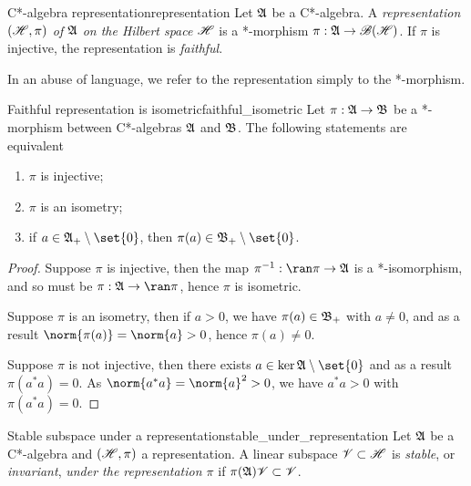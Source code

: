 \begin{definition}{C*-algebra representation}{representation}
    Let \(\mathfrak{A}\) be a C*-algebra. A \emph{representation \((\mathscr{H}, \pi)\) of \(\mathfrak{A}\) on the Hilbert space \(\mathscr{H}\)} is a *-morphism \(\pi : \mathfrak{A} \to \mathscr{B}(\mathscr{H})\). If \(\pi\) is injective, the representation is \emph{faithful}.
\end{definition}
\begin{remark}
    In an abuse of language, we refer to the representation simply to the *-morphism.
\end{remark}


\begin{proposition}{Faithful representation is isometric}{faithful_isometric}
    Let \(\pi : \mathfrak{A} \to \mathfrak{B}\) be a *-morphism between C*-algebras \(\mathfrak{A}\) and \(\mathfrak{B}\). The following statements are equivalent
    \begin{enumerate}[label=(\alph*)]
        \item \(\pi\) is injective;
        \item \(\pi\) is an isometry;
        \item if \(a \in \algebra{A}_+ \setminus\set{0}\), then \(\pi(a) \in \algebra{B}_+\setminus\set{0}\).
    \end{enumerate}
\end{proposition}
\begin{proof}
    Suppose \(\pi\) is injective, then the map \(\pi^{-1} : \ran\pi \to \algebra{A}\) is a *-isomorphism, and so must be \(\pi : \algebra{A} \to \ran\pi\), hence \(\pi\) is isometric.

    Suppose \(\pi\) is an isometry, then if \(a > 0\), we have \(\pi(a) \in \mathfrak{B}_+\) with \(a \neq 0\), and as a result \(\norm{\pi(a)} = \norm{a} > 0\), hence \(\pi(a) \neq 0\).

    Suppose \(\pi\) is not injective, then there exists \(a \in \ker{\algebra{A}}\setminus\set{0}\) and as a result \(\pi(a^*a) = 0\). As \(\norm{a^*a} = \norm{a}^2 > 0\), we have \(a^*a > 0\) with \(\pi(a^*a) = 0\).
\end{proof}
\begin{definition}{Stable subspace under a representation}{stable_under_representation}
    Let \(\mathfrak{A}\) be a C*-algebra and \((\mathscr{H}, \pi)\) a representation. A linear subspace \(\mathscr{V} \subset \mathscr{H}\) is \emph{stable}, or \emph{invariant}, \emph{under the representation \(\pi\)} if \(\pi(\mathfrak{A})\mathscr{V} \subset \mathscr{V}\).
\end{definition}

